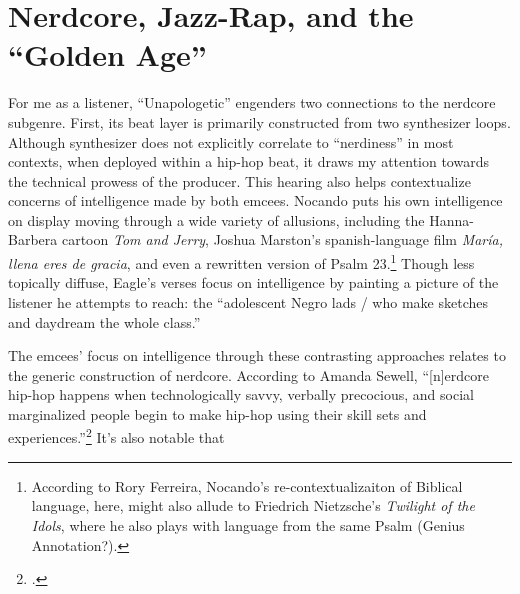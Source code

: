 \section{Nerdcore, Jazz-Rap, and the ``Golden Age''} \label{nerdcorejazzrapgoldenage}

For me as a listener, ``Unapologetic'' engenders two connections to the nerdcore subgenre. First, its beat 
layer is primarily constructed from two synthesizer loops. Although synthesizer does not explicitly
correlate to ``nerdiness'' in most contexts, when deployed within a hip-hop beat, it draws my attention
towards the technical prowess of the producer. This hearing also helps contextualize concerns of intelligence
made by both emcees. Nocando puts his own intelligence on display moving through a wide variety of allusions, 
including the Hanna-Barbera cartoon \textit{Tom and Jerry}, Joshua Marston's spanish-language film 
\textit{María, llena eres de gracia}, and even a rewritten version of Psalm 23.\footnote{
    According to Rory Ferreira, Nocando's re-contextualizaiton of Biblical language, here, might also 
    allude to Friedrich Nietzsche's \textit{Twilight of the Idols}, where he also plays with language
    from the same Psalm (Genius Annotation?).} 
Though less topically diffuse, Eagle's verses focus on intelligence by painting a picture of the listener he
attempts to reach: the ``adolescent Negro lads / who make sketches and daydream the whole class.''

The emcees' focus on intelligence through these contrasting approaches relates to the generic construction of
nerdcore. According to Amanda Sewell, ``[n]erdcore hip-hop happens when technologically savvy, verbally precocious,
and social marginalized people begin to make hip-hop using their skill sets and experiences.''\footnote{
    \autocite[223]{amandasewellNerdcoreHiphop2015}.}
It's also notable that
   
